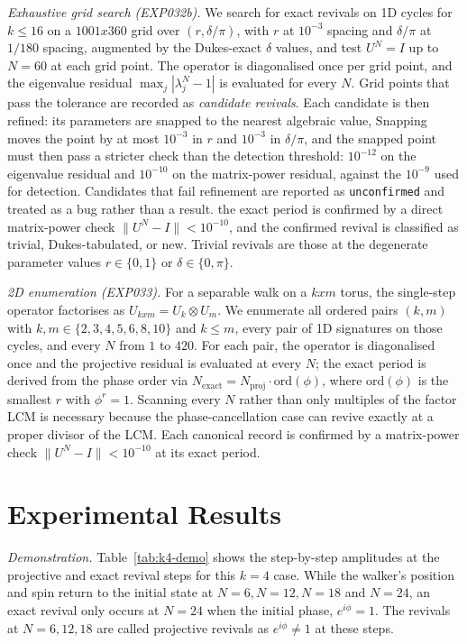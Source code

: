 \documentclass[aps,pra,reprint,amsmath,amssymb,superscriptaddress,floatfix]{revtex4-2}
\def\times{x}%
\def\rho{r}%
\begin{document}
\emph{Exhaustive grid search (EXP032b).} We search for exact
revivals on 1D cycles for $k \le 16$ on a $1001 \times 360$
grid over $(\rho, \delta/\pi)$, with $\rho$ at $10^{-3}$
spacing and $\delta/\pi$ at $1/180$ spacing, augmented by the
Dukes-exact $\delta$ values, and test $U^N = I$ up to $N = 60$
at each grid point. The operator is diagonalised once per grid
point, and the eigenvalue residual $\max_j |\lambda_j^N - 1|$
is evaluated for every $N$. Grid points that pass the tolerance
are recorded as \emph{candidate revivals}. Each candidate is
then refined: its parameters are snapped to the nearest
algebraic value, Snapping moves the point by at most $10^{-3}$ in $\rho$ and
$10^{-3}$ in $\delta/\pi$, and the snapped point must then pass
a stricter check than the detection threshold: $10^{-12}$ on the
eigenvalue residual and $10^{-10}$ on the matrix-power residual,
against the $10^{-9}$ used for detection. Candidates that fail
refinement are reported as \texttt{unconfirmed} and treated as a
bug rather than a result.  the exact period is confirmed by a direct
matrix-power check $\|U^N - I\| < 10^{-10}$, and the confirmed
revival is classified as trivial, Dukes-tabulated, or new.
Trivial revivals are those at the degenerate parameter values
$\rho \in \{0, 1\}$ or $\delta \in \{0, \pi\}$.

\emph{2D enumeration (EXP033).} For a separable walk on a $k \times m$ torus,
the single-step operator factorises as
$U_{k \times m} = U_k \otimes U_m$. We enumerate all ordered pairs
$(k, m)$ with $k, m \in \{2, 3, 4, 5, 6, 8, 10\}$ and $k \le m$,
every pair of 1D signatures on those cycles, and every $N$ from $1$
to $420$. For each pair, the operator is diagonalised once and the
projective residual is evaluated at every $N$; the exact period is
derived from the phase order via
$N_{\text{exact}} = N_{\text{proj}} \cdot \mathrm{ord}(\phi)$,
where $\mathrm{ord}(\phi)$ is the smallest $r$ with $\phi^r = 1$.
Scanning every $N$ rather than only multiples of the factor LCM is
necessary because the phase-cancellation case can revive exactly at
a proper divisor of the LCM. Each canonical record is confirmed by a
matrix-power check $\|U^N - I\| < 10^{-10}$ at its exact period.
\section{\label{sec:results}Experimental Results}\par
\emph{Demonstration.}
Table~\ref{tab:k4-demo} shows the step-by-step amplitudes at the
projective and exact revival steps for this $k = 4$ case. While
the walker's position and spin return to the initial state
at $N=6, N=12, N=18$ and $N=24$, an exact
revival only occurs at $N = 24$ when the initial phase, $e^{i\phi} = 1$.  
The revivals at $N = 6, 12, 18$ are called projective revivals as $e^{i\phi} \neq 1$
at these steps.
\end{document}
